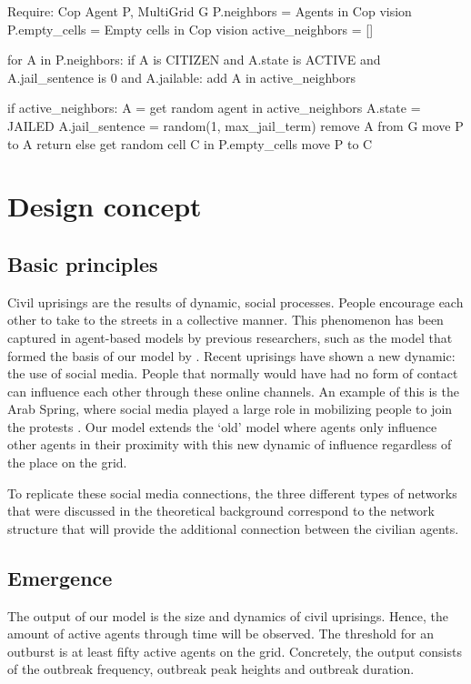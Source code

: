 \documentclass[10pt]{article}
\begin{document}
    \begin{algorithm}[caption = {Role: Cop agent}]
        Require: Cop Agent P, MultiGrid G
        P.neighbors   = Agents in Cop vision
        P.empty_cells = Empty cells in Cop vision
        active_neighbors = []

        for A in P.neighbors:
        if A is CITIZEN and A.state is ACTIVE and A.jail_sentence is 0 and A.jailable:
        add A in active_neighbors

        if active_neighbors:
        A = get random agent in active_neighbors
        A.state = JAILED
        A.jail_sentence = random(1, max_jail_term)
        remove A from G
        move P to A
        return
        else
        get random cell C in P.empty_cells
        move P to C
    \end{algorithm}

    \section{Design concept}
    \subsection{Basic principles}
    Civil uprisings are the results of dynamic, social processes. People encourage each other to take to the streets in a collective manner. This phenomenon has been captured in agent-based models by previous researchers, such as the model that formed the basis of our model by \cite{epstein2001modeling}. Recent uprisings have shown a new dynamic: the use of social media. People that normally would have had no form of contact can influence each other through these online channels. An example of this is the Arab Spring, where social media played a large role in mobilizing people to join the protests \cite{howard2011opening}. Our model extends the `old' model where agents only influence other agents in their proximity with this new dynamic of influence regardless of the place on the grid.

    To replicate these social media connections, the three different types of networks that were discussed in the theoretical background correspond to the network structure that will provide the additional connection between the civilian agents.

    \subsection{Emergence}
    The output of our model is the size and dynamics of civil uprisings. Hence, the amount of active agents through time will be observed. The threshold for an outburst is at least fifty active agents on the grid. Concretely, the output consists of the outbreak frequency, outbreak peak heights and outbreak duration.
\end{document}
